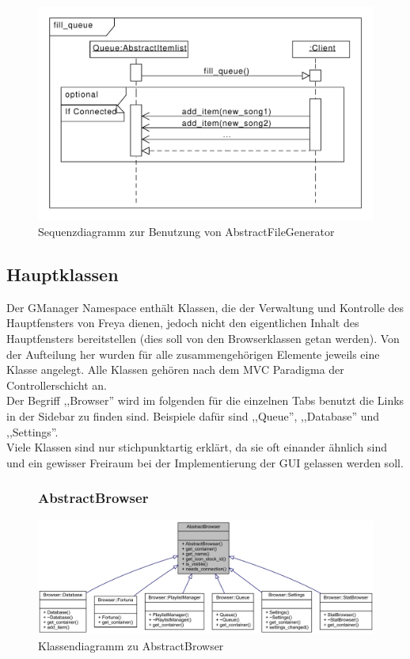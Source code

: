 \begin{itemize}
\begin{figure}[htb!]
	\centering
        \includegraphics[width=\textwidth]{./gfx/seq/fill_queue}
	\caption{Sequenzdiagramm zur Benutzung von AbstractFileGenerator}
	\label{seq_abstract_file_generator}
\end{figure}
\end{itemize}

\newpage

\subsection{Hauptklassen}
Der GManager Namespace enthält Klassen, die der Verwaltung und Kontrolle des Hauptfensters von Freya dienen,
jedoch nicht den eigentlichen Inhalt des Hauptfensters bereitstellen (dies soll von den Browserklassen getan werden).
Von der Aufteilung her wurden für alle zusammengehörigen Elemente jeweils eine Klasse angelegt.
Alle Klassen gehören nach dem MVC Paradigma der Controllerschicht an.
\\
Der Begriff ,,Browser'' wird im folgenden für die einzelnen Tabs benutzt die Links in der Sidebar zu finden sind. 
Beispiele dafür sind ,,Queue'', ,,Database'' und ,,Settings''.
\\
Viele Klassen sind nur stichpunktartig erklärt, da sie oft einander ähnlich sind und ein gewisser Freiraum bei der Implementierung der
GUI gelassen werden soll.

\begin{figure}[htb!]
\subsubsection{AbstractBrowser}
	\centering
        \includegraphics[width=\textwidth]{./gfx/class/abstractbrowser}
	\caption{Klassendiagramm zu AbstractBrowser}
	\label{g_abstract_browser}
\end{figure}


